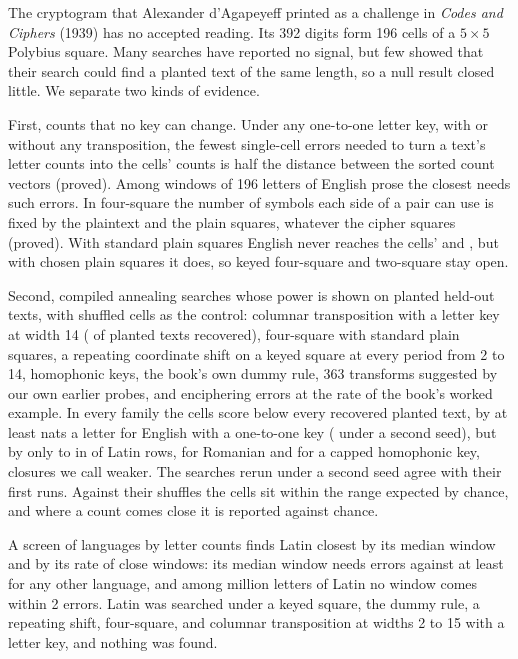 The cryptogram that Alexander d'Agapeyeff printed as a challenge in \emph{Codes and Ciphers} (1939) has no accepted reading. Its 392 digits form 196 cells of a $5 \times 5$ Polybius square. Many searches have reported no signal, but few showed that their search could find a planted text of the same length, so a null result closed little. We separate two kinds of evidence.

First, counts that no key can change. Under any one-to-one letter key, with or without any transposition, the fewest single-cell errors needed to turn a text's letter counts into the cells' counts is half the distance between the sorted count vectors (proved). Among \corpusWindows{} windows of 196 letters of English prose the closest needs \corpusClosestDistance{} such errors. In four-square the number of symbols each side of a pair can use is fixed by the plaintext and the plain squares, whatever the cipher squares (proved). With standard plain squares English never reaches the cells' \fsCellsLow{} and \fsCellsHigh{}, but with chosen plain squares it does, so keyed four-square and two-square stay open.

Second, compiled annealing searches whose power is shown on planted held-out texts, with shuffled cells as the control: columnar transposition with a letter key at width 14 (\widthFourteenRecovered{} of \widthFourteenPlanted{} planted texts recovered), four-square with standard plain squares, a repeating coordinate shift on a keyed square at every period from 2 to 14, homophonic keys, the book's own dummy rule, 363 transforms suggested by our own earlier probes, and enciphering errors at the rate of the book's worked example. In every family the cells score below every recovered planted text, by at least \gapEnglishLow{} nats a letter for English with a one-to-one key (\rsEnglishLow{} under a second seed), but by only \gapLatinLow{} to \gapLatinUnderHigh{} in \gapLatinUnder{} of \gapLatinRows{} Latin rows, \gapRomanianTab{} for Romanian and \gapHomTab{} for a capped homophonic key, closures we call weaker. The searches rerun under a second seed agree with their first runs. Against their shuffles the cells sit within the range expected by chance, and where a count comes close it is reported against chance.

A screen of \allLanguages{} languages by letter counts finds Latin closest by its median window and by its rate of close windows: its median window needs \allLatinMedian{} errors against at least \allOthersMedianLow{} for any other language, and among \latinLettersAll{} million letters of Latin no window comes within 2 errors. Latin was searched under a keyed square, the dummy rule, a repeating shift, four-square, and columnar transposition at widths 2 to 15 with a letter key, and nothing was found.


